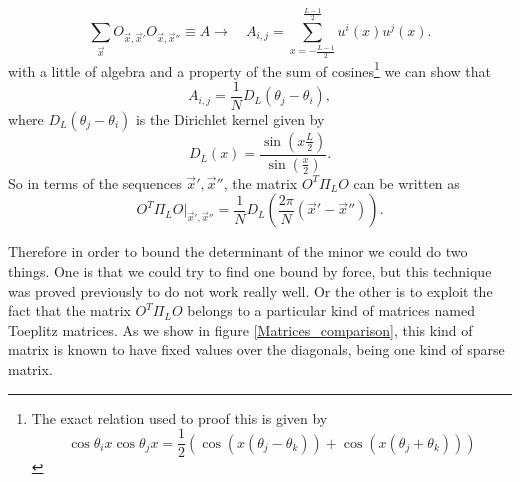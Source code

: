 \begin{equation}
\sum_{\vec{x}}O_{\vec{x},\vec{x}'}O_{\vec{x},\vec{x}''} \equiv A\rightarrow\quad  A_{i,j}=\sum_{x=-\frac{L-1}{2}}^{\frac{L-1}{2}}u^{i}(x)u^{j}(x).
\end{equation}
with a little of algebra and a property of the sum of cosines\footnote{The exact relation used to proof this is given by  \[\cos\theta_i x\cos\theta_j x = \frac{1}{2}\left(\cos(x(\theta_j-\theta_k))+\cos(x(\theta_j+\theta_k))\right)\]} we can show that
\begin{equation}
   A_{i,j} =\frac{1}{N}D_{L}(\theta_{j}-\theta_{i}),
\end{equation}
where $D_{L}(\theta_{j}-\theta_{i})$ is the Dirichlet kernel given by
\begin{equation}
D_L(x)= \frac{\sin\left(x\frac{L}{2}\right)}{\sin\left(\frac{x}{2}\right)}.
\end{equation}
So in terms of the sequences $\vec{x}',\vec{x}''$, the matrix $O^{T}\Pi_L O$ can be written as
\begin{equation}
    O^{T}\Pi_L O\vert_{\vec{x}',\vec{x}''} = \frac{1}{N}D_{L}\left(\frac{2\pi}{N}(\vec{x}'-\vec{x}'')\right).
    \label{CH3:Dirichlet_for_projection_of_transformation_O}
\end{equation}

Therefore in order to bound the determinant of the minor we could do two things. One is that we could try to find one bound by force, but this technique was proved previously to do not work really well. Or the other is to exploit the fact that the matrix $O^{T}\Pi_L O$ belongs to a particular kind of matrices named Toeplitz matrices. As we show in figure \ref{Matrices_comparison}, this kind of matrix is known to have fixed values over the diagonals, being one kind of sparse matrix.

